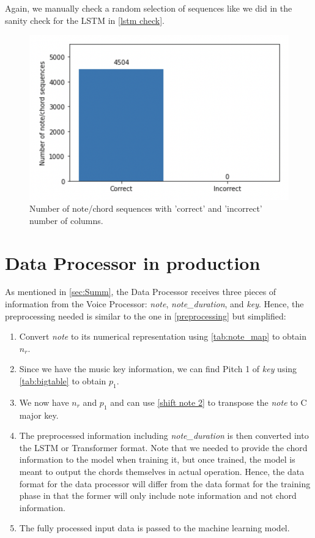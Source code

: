 Again, we manually check a random selection of sequences like we did in the sanity check for the LSTM in \cref{lstm check}.

\begin{figure}
    \centering
    \includegraphics{Figures/Transformer check}
    \decoRule
    \caption{Number of note/chord sequences with 'correct' and 'incorrect' number of columns.}
    \label{fig:Transformer check}
    \end{figure}


\section{Data Processor in production}
\label{data processor}
As mentioned in \cref{sec:Summ}, the Data Processor receives three pieces of information from the Voice Processor: \emph{note}, \emph{note\_duration}, and \emph{key}. Hence, the preprocessing needed is similar to the one in \cref{preprocessing} but simplified:

\begin{enumerate}
    \item Convert \emph{note} to its numerical representation using \cref{tab:note_map} to obtain $n_r$.
    \item Since we have the music key information, we can find Pitch 1 of \emph{key} using \cref{tab:bigtable} to obtain $p_1$.
    \item We now have $n_r$ and $p_1$ and can use \cref{shift note 2} to transpose the \emph{note} to C major key.
    \item The preprocessed information including \emph{note\_duration} is then converted into the LSTM or Transformer format. Note that we needed to provide the chord information to the model when training it, but once trained, the model is meant to output the chords themselves in actual operation. Hence, the data format for the data processor will differ from the data format for the training phase in that the former will only include note information and not chord information.
    \item The fully processed input data is passed to the machine learning model.
  \end{enumerate}

